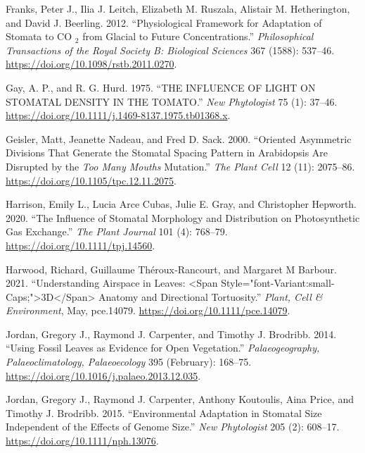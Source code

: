 \documentclass[12pt,halfline,a4paper,]{ouparticle}
\newlength{\cslhangindent}
\newlength{\cslentryspacingunit} %
\newenvironment{CSLReferences}[2] %
 {%
  \setlength{\parindent}{0pt}
  \ifodd #1
  \let\oldpar\par
  \def\par{\hangindent=\cslhangindent\oldpar}
  \fi
  \setlength{\parskip}{#2\cslentryspacingunit}
 }%
 {}
\begin{document}
\begin{CSLReferences}{1}{0}
\leavevmode{}%
Franks, Peter J., Ilia J. Leitch, Elizabeth M. Ruszala, Alistair M.
Hetherington, and David J. Beerling. 2012. {``Physiological Framework
for Adaptation of Stomata to {CO} \(_{\textrm{2}}\) from Glacial to
Future Concentrations.''} \emph{Philosophical Transactions of the Royal
Society B: Biological Sciences} 367 (1588): 537--46.
\url{https://doi.org/10.1098/rstb.2011.0270}.

\leavevmode{}%
Gay, A. P., and R. G. Hurd. 1975. {``{THE} {INFLUENCE} {OF} {LIGHT} {ON}
{STOMATAL} {DENSITY} {IN} {THE} {TOMATO}.''} \emph{New Phytologist} 75
(1): 37--46. \url{https://doi.org/10.1111/j.1469-8137.1975.tb01368.x}.

\leavevmode{}%
Geisler, Matt, Jeanette Nadeau, and Fred D. Sack. 2000. {``Oriented
{Asymmetric} {Divisions} {That} {Generate} the {Stomatal} {Spacing}
{Pattern} in {Arabidopsis} {Are} {Disrupted} by the \emph{Too Many
Mouths} {Mutation}.''} \emph{The Plant Cell} 12 (11): 2075--86.
\url{https://doi.org/10.1105/tpc.12.11.2075}.

\leavevmode{}%
Harrison, Emily L., Lucia Arce Cubas, Julie E. Gray, and Christopher
Hepworth. 2020. {``The Influence of Stomatal Morphology and Distribution
on Photosynthetic Gas Exchange.''} \emph{The Plant Journal} 101 (4):
768--79. \url{https://doi.org/10.1111/tpj.14560}.

\leavevmode{}%
Harwood, Richard, Guillaume Théroux‐Rancourt, and Margaret M Barbour.
2021. {``Understanding Airspace in Leaves: {\textless{}}Span
Style="font-Variant:small-Caps;"{\textgreater{}}{3D}{\textless{}}/Span{\textgreater{}}
Anatomy and Directional Tortuosity.''} \emph{Plant, Cell \&
Environment}, May, pce.14079. \url{https://doi.org/10.1111/pce.14079}.

\leavevmode{}%
Jordan, Gregory J., Raymond J. Carpenter, and Timothy J. Brodribb. 2014.
{``Using Fossil Leaves as Evidence for Open Vegetation.''}
\emph{Palaeogeography, Palaeoclimatology, Palaeoecology} 395 (February):
168--75. \url{https://doi.org/10.1016/j.palaeo.2013.12.035}.

\leavevmode{}%
Jordan, Gregory J., Raymond J. Carpenter, Anthony Koutoulis, Aina Price,
and Timothy J. Brodribb. 2015. {``Environmental Adaptation in Stomatal
Size Independent of the Effects of Genome Size.''} \emph{New
Phytologist} 205 (2): 608--17. \url{https://doi.org/10.1111/nph.13076}.


\end{CSLReferences}
\end{document}
